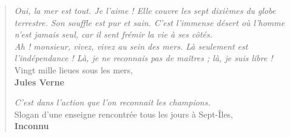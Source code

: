 \thispagestyle{empty}

\begin{minipage}[l]{0.45\textwidth}

\end{minipage}%
\hfill
\begin{minipage}[r]{0.5\textwidth}
\begin{quotation}
\begin{doublespace}

\guillemotleft \textit{Oui, la mer est tout. Je l'aime ! Elle couvre les sept dixièmes du globe terrestre. Son souffle est pur et sain. C'est l'immense désert où l'homme n'est jamais seul, car il sent frémir la vie à ses côtés.} \\
\textit{Ah ! monsieur, vivez, vivez au sein des mers. Là seulement est l'indépendance ! Là, je ne reconnais pas de maîtres ; là, je suis libre !} \guillemotright \\
Vingt mille lieues sous les mers, \\
\textbf{Jules Verne}

\vspace{15mm}

\guillemotleft \textit{ C'est dans l'action que l'on reconnait les champions.} \guillemotright \\
Slogan d'une enseigne rencontrée tous les jours à Sept-Îles, \\
\textbf{Inconnu}

\end{doublespace}
\end{quotation}
\end{minipage}%

\cleardoublepage
